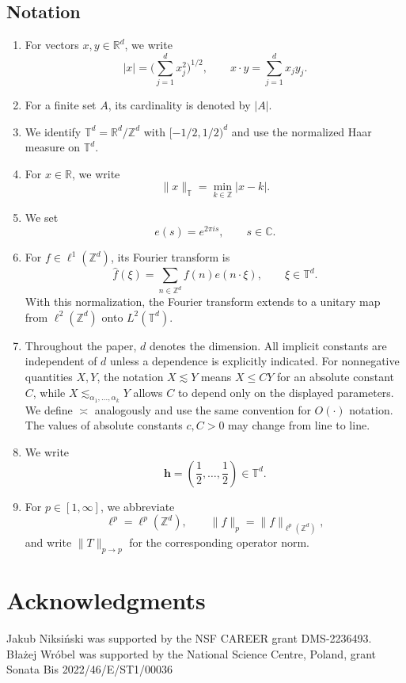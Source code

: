 \documentclass{article}
\newcommand{\Z}{\mathbb Z}
\newcommand{\R}{\mathbb R}
\newcommand{\C}{\mathbb C}
\newcommand{\T}{\mathbb T}
\theoremstyle{plain}
\numberwithin{equation}{section}
\begin{document}
\subsection{Notation}
\label{ssec:not}
\begin{enumerate}
\item For vectors $x,y\in\R^d$, we write
\[
  |x|=\Big(\sum_{j=1}^d x_j^2\Big)^{1/2},
  \qquad
  x\cdot y=\sum_{j=1}^d x_jy_j.
\]
\item For a finite set $A$, its cardinality is denoted by $|A|$.

\item We identify $\T^d=\R^d/\Z^d$ with $[-1/2,1/2)^d$ and use
the normalized Haar measure on $\T^d$. 
\item For $x\in\R$, we write
\[
  \|x\|_{\T}=\min_{k\in\Z}|x-k|.
\]
\item We set
\[
  e(s)=e^{2\pi i s},\qquad s\in\C.
\]

\item For $f\in\ell^1(\Z^d)$, its Fourier transform is
\[
  \widehat f(\xi)
  =\sum_{n\in\Z^d}f(n)e(n\cdot\xi),
  \qquad \xi\in\T^d.
\]
With this normalization, the Fourier transform extends to a unitary
map from $\ell^2(\Z^d)$ onto $L^2(\T^d)$.

\item Throughout the paper, $d$ denotes the dimension. All implicit
constants are independent of $d$ unless a dependence is explicitly
indicated. For nonnegative quantities $X,Y$, the notation
$X\lesssim Y$ means $X\le CY$ for an absolute constant $C$, while
$X\lesssim_{\alpha_1,\ldots,\alpha_k}Y$ allows $C$ to depend only on
the displayed parameters. We define $\asymp$ analogously and use the
same convention for $O(\cdot)$ notation. The values of absolute
constants $c,C>0$ may change from line to line.

\item We write
\[
  \mathbf h=\left(\frac12,\ldots,\frac12\right)\in\T^d.
\]
\item For $p\in[1,\infty]$, we abbreviate
\[
  \ell^p=\ell^p(\Z^d),\qquad
  \|f\|_p=\|f\|_{\ell^p(\Z^d)},
\]
and write $\|T\|_{p\to p}$ for the corresponding operator norm.
\end{enumerate}
\section*{Acknowledgments}
Jakub Niksiński was supported by the NSF CAREER grant DMS-2236493. Błażej Wróbel was supported by the National Science Centre, Poland, grant Sonata Bis 2022/46/E/ST1/00036
\end{document}
